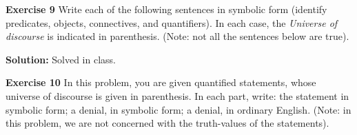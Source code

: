 \documentclass[12pt,oneside]{exam}
\newenvironment{exercise}[1]{\vspace{.1in}\noindent\textbf{Exercise #1 \hspace{.05em}}}{}
\newenvironment{newsolution}{\vspace{.1in}\noindent\textbf{Solution: \hspace{.05em}}}{}
\begin{document}
\begin{exercise}{9}
Write each of the following sentences in symbolic form (identify predicates, objects, connectives, and quantifiers). In each case, the \textit{Universe of discourse} is indicated in parenthesis. (Note: not all the sentences below are true).
\end{exercise}

\begin{newsolution}
Solved in class.
\end{newsolution}

\begin{exercise}{10} 
In this problem, you are given quantified statements, whose universe of discourse is given in parenthesis. In each part, write: the statement in symbolic form; a denial, in symbolic form; a denial, in ordinary English. (Note: in this problem, we are not concerned with the truth-values of the statements). 
\end{exercise}
\end{document}
